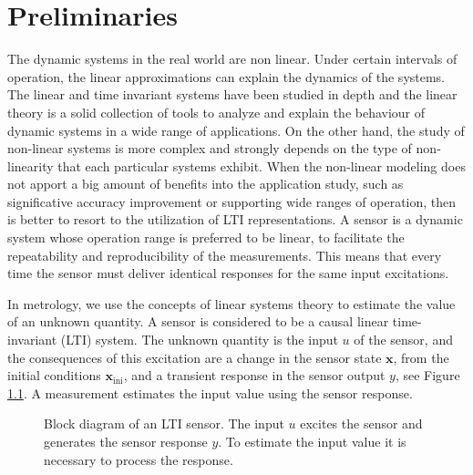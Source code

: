 \glsresetall

\chapter{Preliminaries} \label{chap:Preliminaries}

\color{blue}
The dynamic systems in the real world are non linear. 
Under certain intervals of operation, the linear approximations can explain the dynamics of the systems. 
The linear and time invariant systems have been studied in depth and the linear theory is a solid collection of tools to analyze and explain the behaviour of dynamic systems in a wide range of applications. 
On the other hand, the study of non-linear systems is more complex and strongly depends on the type of non-linearity that each particular systems exhibit. 
When the non-linear modeling does not apport a big amount of benefits into the application study, such as significative accuracy improvement or supporting wide ranges of operation, then is better to resort to the utilization of LTI representations. 
A sensor is a dynamic system whose operation range is preferred to be linear, to facilitate the repeatability and reproducibility of the measurements.
This means that every time the sensor must deliver identical responses for the same input excitations.   
\color{black}

In metrology, we use the concepts of linear systems theory to estimate the value of an unknown quantity.
A sensor is considered to be a causal linear time-invariant (LTI) system.
The unknown quantity is the input ${u}$ of the sensor, and the consequences of this excitation are a change in the sensor state $\mathbf{x}$, from the initial conditions $\mathbf{x}_{\text{ini}}$, and a transient response in the sensor output ${y}$, see Figure \ref{fig:sysLTI}.  
A measurement estimates the input value using the sensor response.

\begin{figure}[htb!]
\centering
{}
 \caption{Block diagram of an LTI sensor. The input ${u}$ excites the sensor and generates the sensor response ${y}$. To estimate the input value it is necessary to process the response.} \label{fig:sysLTI}
 \end{figure}

